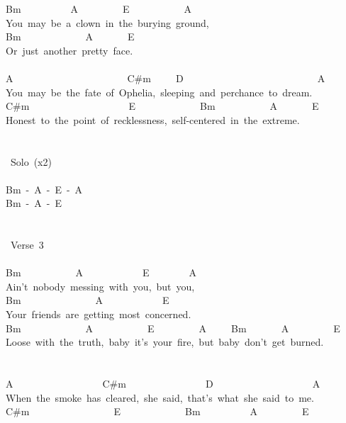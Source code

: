 {Bm\ \ \ \ \ \ \ \ \ \ A\ \ \ \ \ \ \ \ \ E\ \ \ \ \ \ \ \ \ \ \ A\\
You\ may\ be\ a\ clown\ in\ the\ burying\ ground,\\
Bm\ \ \ \ \ \ \ \ \ \ \ \ \ A\ \ \ \ \ \ \ E\\
Or\ just\ another\ pretty\ face.\\
\\
A\ \ \ \ \ \ \ \ \ \ \ \ \ \ \ \ \ \ \ \ \ \ \ C\#m\ \ \ \ \ D\ \ \ \ \ \ \ \ \ \ \ \ \ \ \ \ \ \ \ \ \ \ \ \ \ \ \ A\\
You\ may\ be\ the\ fate\ of\ Ophelia,\ sleeping\ and\ perchance\ to\ dream.\\
C\#m\ \ \ \ \ \ \ \ \ \ \ \ \ \ \ \ \ \ \ \ E\ \ \ \ \ \ \ \ \ \ \ \ \ Bm\ \ \ \ \ \ \ \ \ \ \ A\ \ \ \ \ \ \ E\\
Honest\ to\ the\ point\ of\ recklessness,\ self-centered\ in\ the\ extreme.\\
\\
\\
\lbrack\ Solo\rbrack\ (x2)\\
\\
Bm\ -\ A\ -\ E\ -\ A\\
Bm\ -\ A\ -\ E\\
\\
\\
\lbrack\ Verse\ 3\rbrack\\
\\
Bm\ \ \ \ \ \ \ \ \ \ \ A\ \ \ \ \ \ \ \ \ \ \ \ E\ \ \ \ \ \ \ \ A\\
Ain't\ nobody\ messing\ with\ you,\ but\ you,\\
Bm\ \ \ \ \ \ \ \ \ \ \ \ \ \ \ A\ \ \ \ \ \ \ \ \ \ \ \ E\\
Your\ friends\ are\ getting\ most\ concerned.\\
Bm\ \ \ \ \ \ \ \ \ \ \ \ \ A\ \ \ \ \ \ \ \ \ \ \ E\ \ \ \ \ \ \ \ \ A\ \ \ \ \ Bm\ \ \ \ \ \ \ A\ \ \ \ \ \ \ \ \ E\\
Loose\ with\ the\ truth,\ baby\ it's\ your\ fire,\ but\ baby\ don't\ get\ burned.\\
\\
\\
A\ \ \ \ \ \ \ \ \ \ \ \ \ \ \ \ \ \ C\#m\ \ \ \ \ \ \ \ \ \ \ \ \ \ \ \ D\ \ \ \ \ \ \ \ \ \ \ \ \ \ \ \ \ \ \ \ A\\
When\ the\ smoke\ has\ cleared,\ she\ said,\ that's\ what\ she\ said\ to\ me.\\
C\#m\ \ \ \ \ \ \ \ \ \ \ \ \ \ \ \ \ E\ \ \ \ \ \ \ \ \ \ \ \ \ Bm\ \ \ \ \ \ \ \ \ \ A\ \ \ \ \ \ \ \ \ E\\
}
